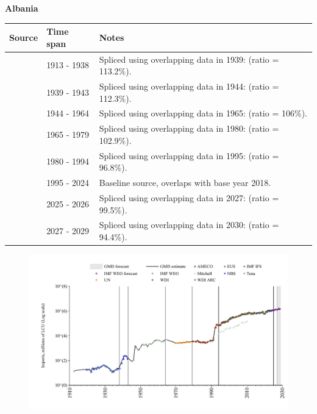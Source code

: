 \documentclass[12pt,a4paper,landscape]{article}
\begin{document}
\begin{adjustbox}{max totalsize={\paperwidth}{\paperheight},center}
\begin{minipage}[t][\textheight][t]{\textwidth}
\vspace*{0.5cm}
{}
\begin{center}
{\Large\bfseries Albania}
\end{center}
\vspace{0.5cm}
\begin{table}[H]
\centering
\small
\begin{tabular}{|l|l|l|}
\hline
\textbf{Source} & \textbf{Time span} & \textbf{Notes} \\
\hline
\rowcolor{white}\cite{Tena}& 1913 - 1938 &Spliced using overlapping data in 1939: (ratio = 113.2\%).\\
\rowcolor{lightgray}\cite{NBS}& 1939 - 1943 &Spliced using overlapping data in 1944: (ratio = 112.3\%).\\
\rowcolor{white}\cite{Mitchell}& 1944 - 1964 &Spliced using overlapping data in 1965: (ratio = 106\%).\\
\rowcolor{lightgray}\cite{UN}& 1965 - 1979 &Spliced using overlapping data in 1980: (ratio = 102.9\%).\\
\rowcolor{white}\cite{WDI}& 1980 - 1994 &Spliced using overlapping data in 1995: (ratio = 96.8\%).\\
\rowcolor{lightgray}\cite{EUS}& 1995 - 2024 &Baseline source, overlaps with base year 2018.\\
\rowcolor{white}\cite{AMECO}& 2025 - 2026 &Spliced using overlapping data in 2027: (ratio = 99.5\%).\\
\rowcolor{lightgray}\cite{IMF_WEO_forecast}& 2027 - 2029 &Spliced using overlapping data in 2030: (ratio = 94.4\%).\\
\hline
\end{tabular}
\end{table}
\begin{figure}[H]
\centering
\includegraphics[width=\textwidth,height=0.6\textheight,keepaspectratio]{graphs/ALB_imports.pdf}
\end{figure}
\end{minipage}
\end{adjustbox}
\end{document}
